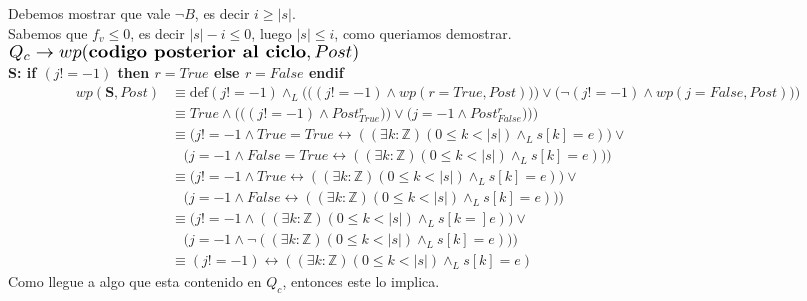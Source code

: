 \documentclass[a4paper]{article}
\begin{document}
	Debemos mostrar que vale $\neg B$, es decir $i\geq |s|$.\\
	Sabemos que $f_v\leq 0$, es decir $|s|-i\leq 0$, luego $|s|\leq i$, como queriamos demostrar.\medskip\\
	\noindent
$\scalebox{1.3}{$Q_c \rightarrow wp(\textbf{codigo posterior al ciclo},Post)$}$\medskip \\
\textbf{S: if $(j != -1)$ then $r=True$ else $r=False$ endif}\\
\begin{align*}
   			wp(\textbf{S},Post)&\equiv \textrm{def}(j != -1)\wedge_L 
   				\Bigg(\Big((j!=-1)\wedge wp(r=True,Post))\Big) \vee\Big(\neg (j!=-1)\wedge wp(j=False,Post)\Big)\Bigg)\\
   					&\equiv True \wedge \Bigg(\Big((j!=-1)\wedge Post_{True}^{r})\Big) 
   						\vee\Big(j=-1\wedge Post_{False}^{r})\Big)\Bigg)\\ 
   				&\equiv \Big(j!=-1\wedge True=True \leftrightarrow ((\exists k:\mathbb{Z})(0\leq k<|s|)\wedge_L s[k]=e)\Big) \vee\\
   						&\ \ \ \ \Big(j=-1\wedge False=True \leftrightarrow ((\exists k:\mathbb{Z})(0\leq k<|s|)\wedge_L s[k]=e))\Big)\\ 
   				&\equiv \Big(j!=-1\wedge True \leftrightarrow ((\exists k:\mathbb{Z})(0\leq k<|s|)\wedge_L s[k]=e)\Big) \vee\\
   						&\ \ \ \ \Big(j=-1\wedge False \leftrightarrow ((\exists k:\mathbb{Z})(0\leq k<|s|)\wedge_L s[k]=e))\Big)\\   
   				&\equiv \Big(j!=-1\wedge ((\exists k:\mathbb{Z})(0\leq k<|s|)\wedge_L s[k=]e)\Big) \vee\\
   						&\ \ \ \ \Big(j=-1\wedge \neg((\exists k:\mathbb{Z})(0\leq k<|s|)\wedge_L s[k]=e))\Big)\\    	
   				&\equiv (j!=-1)\leftrightarrow ((\exists k:\mathbb{Z})(0\leq k<|s|)\wedge_L s[k]=e)  						   				  		
   		\end{align*}
Como llegue  a algo que esta contenido en $Q_c$, entonces este lo implica.
\end{document}
